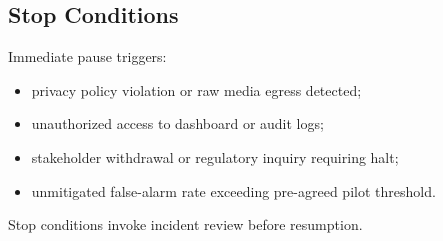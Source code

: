 \subsection{Stop Conditions}

Immediate pause triggers:
\begin{itemize}[noitemsep]
  \item privacy policy violation or raw media egress detected;
  \item unauthorized access to dashboard or audit logs;
  \item stakeholder withdrawal or regulatory inquiry requiring halt;
  \item unmitigated false-alarm rate exceeding pre-agreed pilot threshold.
\end{itemize}

Stop conditions invoke incident review before resumption.
